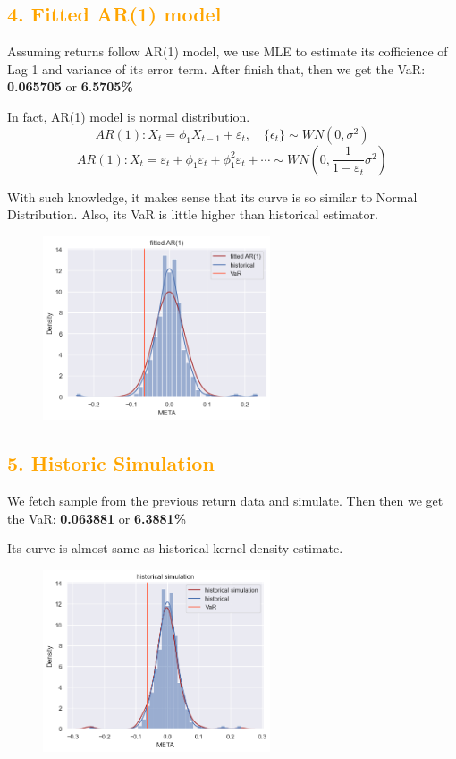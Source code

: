 \documentclass[11pt,en]{elegantpaper}
\begin{document}
\subsection*{\textcolor{orange}{4. Fitted AR(1) model}}

Assuming returns follow AR(1) model, we use MLE to estimate its cofficience of Lag 1 and variance of its error term. After finish that, then we get the VaR: \textbf{0.065705} or \textbf{6.5705\%} 

In fact, AR(1) model is normal distribution.
\[AR(1):X_t=\phi_1X_{t-1}+\varepsilon_t, \quad \{\epsilon_t\}\sim WN(0,\sigma^2)\]
\[AR(1):X_t=\varepsilon_t+\phi_1\varepsilon_t+\phi_1^2\varepsilon_t+\cdots \sim WN(0,\frac{1}{1-\varepsilon_t}\sigma^2)\]

With such knowledge, it makes sense that its curve is so similar to Normal Distribution. Also, its VaR is little higher than historical estimator.
\begin{figure}[htbp] 
    \centering 
    \includegraphics[width=0.6\textwidth]{./image/AR1.png} 
\end{figure}

\subsection*{\textcolor{orange}{{5. Historic Simulation}}}

 We fetch sample from the previous return data and simulate. Then then we get the VaR: \textbf{0.063881} or \textbf{6.3881\%} 

Its curve is almost same as historical kernel density estimate.
\begin{figure}[htbp] 
    \centering 
    \includegraphics[width=0.6\textwidth]{./image/historic.png} 
\end{figure}
\end{document}
